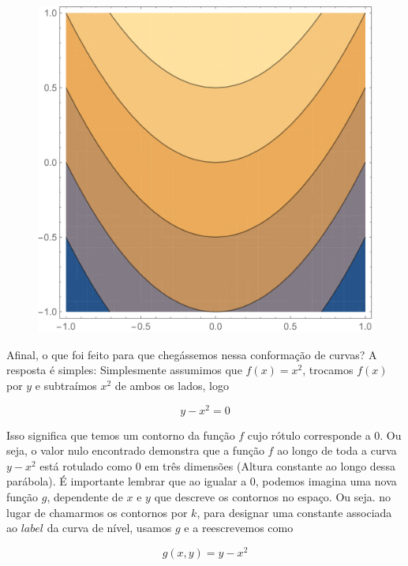 \documentclass[a4paper, 12pt]{article}
\begin{document}
\begin{figure}[!h]
	\centering
	\includegraphics[scale=.27]{images/ContourPlot}
\end{figure}

	Afinal, o que foi feito para que chegássemos nessa conformação de curvas? A resposta é simples: Simplesmente assumimos que $f(x)=x^{2}$, trocamos $f(x)$ por $y$ e subtraímos $x^{2}$ de ambos os lados, logo
	
	\begin{equation}
		y-x^{2}=0
	\end{equation}
	
	Isso significa que temos um contorno da função $f$ cujo rótulo corresponde a 0. Ou seja, o valor nulo encontrado demonstra que a função $f$ ao longo de toda a curva $y-x^{2}$ está rotulado como 0 em três dimensões (Altura constante ao longo dessa parábola). É importante lembrar que ao igualar a 0, podemos imagina uma nova função $g$, dependente de $x$ e $y$ que descreve os contornos no espaço. Ou seja. no lugar de chamarmos os contornos por $k$, para designar uma constante associada ao $label$ da curva de nível, usamos $g$ e a reescrevemos como
	
	\begin{equation}
		g(x,y)=y-x^{2}
	\end{equation}
	
	
	
\end{document}

